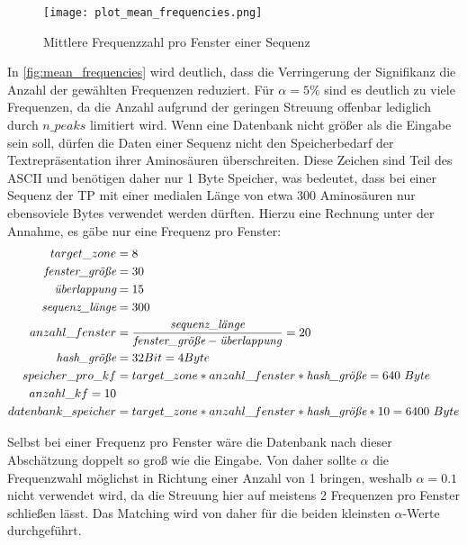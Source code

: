         \begin{figure}
             \texttt{[image: plot\_mean\_frequencies.png]}
             \caption{Mittlere Frequenzzahl pro Fenster einer Sequenz}
             \label{fig:mean_frequencies}
        \end{figure} 

        In \autoref{fig:mean_frequencies} wird deutlich, dass die Verringerung der Signifikanz die Anzahl der gewählten Frequenzen reduziert. Für $\alpha=5\%$ sind es deutlich zu viele Frequenzen, da die Anzahl aufgrund der geringen Streuung offenbar lediglich durch $n\_peaks$ limitiert wird. Wenn eine Datenbank nicht größer als die Eingabe sein soll, dürfen die Daten einer Sequenz nicht den Speicherbedarf der Textrepräsentation ihrer Aminosäuren überschreiten. Diese Zeichen sind Teil des \ac{ASCII} und benötigen daher nur 1 Byte Speicher, was bedeutet, dass bei einer Sequenz der \ac{TP} mit einer medialen Länge von etwa 300 Aminosäuren nur ebensoviele Bytes verwendet werden dürften. Hierzu eine Rechnung unter der Annahme, es gäbe nur eine Frequenz pro Fenster:
        \begin{equation}
            \begin{split}
                target\_zone &= 8\\
                \emph{fenster\_größe} &= 30\\
                \emph{überlappung} &= 15\\
                \emph{sequenz\_länge} &= 300\\
                anzahl\_fenster &= \frac{\emph{sequenz\_länge}}{\emph{fenster\_größe} - \emph{überlappung}} = 20\\
                \emph{hash\_größe} &= 32 Bit = 4 Byte\\
                speicher\_pro\_kf &= target\_zone * anzahl\_fenster * \emph{hash\_größe} = 640\ Byte\\
                anzahl\_kf = 10\\
                datenbank\_speicher &= target\_zone * anzahl\_fenster * \emph{hash\_größe} * 10 = 6400\ Byte
            \end{split}
        \end{equation}

        Selbst bei einer Frequenz pro Fenster wäre die Datenbank nach dieser Abschätzung doppelt so groß wie die Eingabe. Von daher sollte $\alpha$ die Frequenzwahl möglichst in Richtung einer Anzahl von 1 bringen, weshalb $\alpha=0.1$ nicht verwendet wird, da die Streuung hier auf meistens 2 Frequenzen pro Fenster schließen lässt. Das Matching wird von daher für die beiden kleinsten $\alpha$-Werte durchgeführt.

